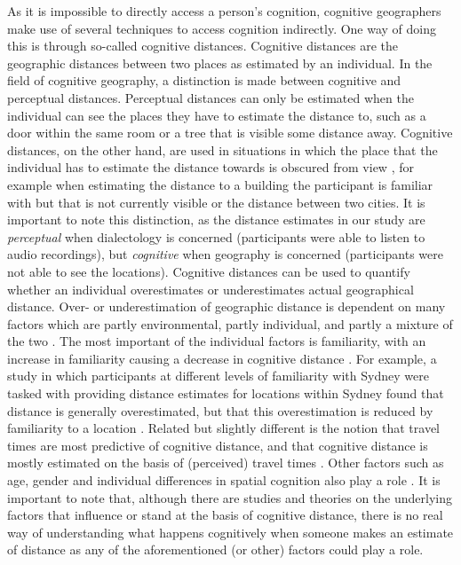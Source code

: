\documentclass[output=paper,colorlinks,citecolor=brown,draft]{langscibook}
\begin{document}
As it is impossible to directly access a person's cognition, cognitive geographers make use of several techniques to access cognition indirectly. One way of doing this is through so-called cognitive distances. Cognitive distances are the geographic distances between two places as estimated by an individual. In the field of cognitive geography, a distinction is made between cognitive and perceptual distances. Perceptual distances can only be estimated when the individual can see the places they have to estimate the distance to, such as a door within the same room or a tree that is visible some distance away. Cognitive distances, on the other hand, are used in situations in which the place that the individual has to estimate the distance towards is obscured from view \citep{montello_measurement_1991}, for example when estimating the distance to a building the participant is familiar with but that is not currently visible or the distance between two cities. It is important to note this distinction, as the distance estimates in our study are \textit{perceptual} when dialectology is concerned (participants were able to listen to audio recordings), but \textit{cognitive} when geography is concerned (participants were not able to see the locations). Cognitive distances can be used to quantify whether an individual overestimates or underestimates actual geographical distance. Over- or underestimation of geographic distance is dependent on many factors which are partly environmental, partly individual, and partly a mixture of the two \citep{qi_formal_2006}. The most important of the individual factors is familiarity, with an increase in familiarity causing a decrease in cognitive distance \citep{montello_measurement_1991}. For example, a study in which participants at different levels of familiarity with Sydney were tasked with providing distance estimates for locations within Sydney found that distance is generally overestimated, but that this overestimation is reduced by familiarity to a location \citep{day_urban_1976}. Related but slightly different is the notion that travel times are most predictive of cognitive distance, and that cognitive distance is mostly estimated on the basis of (perceived) travel times \citep{maceachren_travel_1980}. Other factors such as age, gender \citep{lawton_sex_2018} and individual differences in spatial cognition also play a role \citep{jenkins_cognitive_1992}. It is important to note that, although there are studies and theories on the underlying factors that influence or stand at the basis of cognitive distance, there is no real way of understanding what happens cognitively when someone makes an estimate of distance as any of the aforementioned (or other) factors could play a role. 
\end{document}
